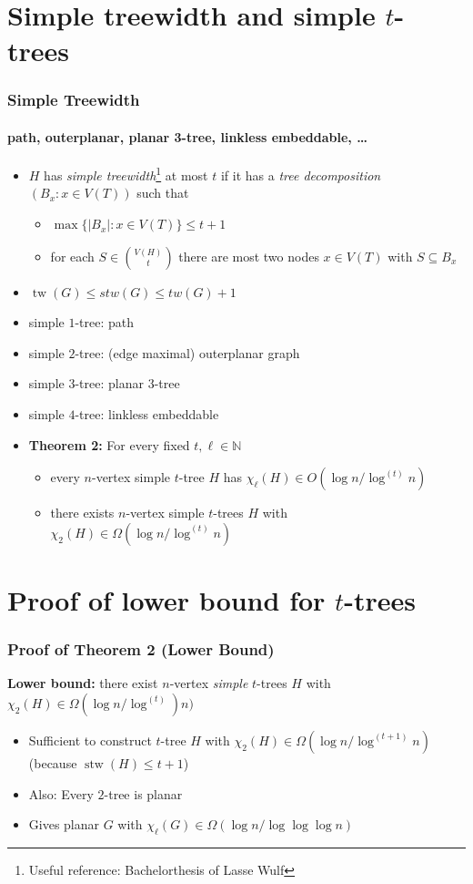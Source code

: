 \documentclass[xcolor=dvipsnames]{beamer}
\newcommand{\N}{\mathbb{N}}
\DeclareMathOperator{\tw}{tw}
\DeclareMathOperator{\stw}{stw}
\begin{document}
\section{Simple treewidth and simple $t$-trees}

\begin{frame}
  \frametitle{Simple Treewidth}
  \framesubtitle{path, outerplanar, planar 3-tree, linkless embeddable, \ldots}

  \begin{itemize}[<+->]
    \item $H$ has \emph{simple treewidth}\footnote{Useful reference: Bachelorthesis of Lasse Wulf} at most $t$ if it has a \emph{tree decomposition} $(B_x:x\in V(T))$ such that
    \begin{itemize}
      \item $\max\{|B_x|:x\in V(T)\}\le t+1$
      \item for each $S\in \binom{V(H)}{t}$ there are most two nodes $x\in V(T)$ with $S\subseteq B_x$
    \end{itemize}
    \item $\tw(G) \le stw(G)\le tw(G)+1$
    \item simple $1$-tree: path
    \item simple $2$-tree: (edge maximal) outerplanar graph
    \item simple $3$-tree: planar $3$-tree
    \item simple $4$-tree: linkless embeddable
    \item[]\textbf{Theorem 2:} For every fixed $t,\ell\in\N$
    \begin{itemize}
      \item every $n$-vertex simple $t$-tree $H$ has $\chi_\ell(H)\in O(\log n/\log^{(t)} n)$
      \item there exists $n$-vertex simple $t$-trees $H$ with $\chi_2(H)\in\Omega(\log n/\log^{(t)} n)$
    \end{itemize}
  \end{itemize}
\end{frame}


\section{Proof of lower bound for $t$-trees}

\begin{frame}
  \frametitle{Proof of Theorem 2 (Lower Bound)}

  \textbf{Lower bound:} there exist $n$-vertex \emph{simple} $t$-trees $H$ with $\chi_2(H)\in\Omega(\log n/\log^{(t)}) n)$
  \begin{itemize}[<+->]
    \item Sufficient to construct $t$-tree $H$ with $\chi_2(H)\in\Omega(\log n/\log^{(t+1)} n)$  (because $\stw(H)\le t+1$)
    \item Also: Every $2$-tree is planar
    \item Gives planar $G$ with $\chi_\ell(G)\in\Omega(\log n/\log\log\log n)$
  \end{itemize}
\end{frame}
\end{document}

